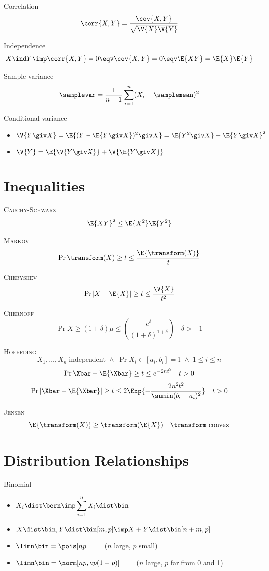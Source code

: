 \documentclass[landscape]{article}
\begin{document}
\begin{multicols*}{2}
Correlation
\[\corr{X,Y} = \displaystyle\frac{\cov{X,Y}}{\sqrt{\V{X}\V{Y}}}\]

Independence
\[X\ind Y \imp \corr{X,Y} = 0 \eqv \cov{X,Y} = 0 \eqv \E{XY}=\E{X}\E{Y}\]

Sample variance
\[\samplevar = \frac{1}{n-1}\sum_{i=1}^n(X_i-\samplemean)^2\]

Conditional variance
\begin{itemize}
  \item $\V{Y\giv X} = \E{(Y-\E{Y\giv X})^2\giv X} =\E{Y^2\giv X}-\E{Y\giv X}^2$
  \item $\V{Y} = \E{\V{Y\giv X}}+\V{\E{Y\giv X}}$
\end{itemize}

\section{Inequalities}

\textsc{Cauchy-Schwarz}
\[\E{XY}^2 \le \E{X^2}\E{Y^2}\]

\textsc{Markov}
\[\Pr{\transform(X) \ge t}\le\frac{\E{\transform(X)}}{t}\]

\textsc{Chebyshev}
\[\Pr{\lvert X-\E{X}\rvert \ge t} \le \frac{\V{X}}{t^2}\]

\textsc{Chernoff}
\[\Pr{X \ge (1+\delta)\mu}
\le \left(\frac{e^\delta}{(1+\delta)^{1+\delta}}\right) \quad \delta>-1\]

\textsc{Hoeffding}
\[X_1,\ldots,X_n \; \textrm{independent}
\;\wedge\; \Pr{X_i\in[a_i,b_i]} = 1 \;\wedge\; 1 \le i \le n \]
\[\Pr{\Xbar-\E{\Xbar} \ge t} \le e^{-2nt^2} \quad t>0 \]
\[\Pr{|\Xbar-\E{\Xbar}| \ge t} \le 2\Exp{-\frac{2n^2t^2}{\sumin(b_i-a_i)^2}}
\quad t>0\]

\textsc{Jensen}\label{jensen}
\[\E{\transform(X)} \ge \transform(\E{X}) \quad
  \transform \text{ convex}\]

\section{Distribution Relationships}

Binomial
\begin{itemize}
  \item $X_i \dist \bern \imp \displaystyle\sum_{i=1}^n X_i \dist \bin$
  \item $X\dist\bin, Y\dist\bin[m,p] \imp X+Y\dist\bin[n+m,p]$
  \item $\limn\bin = \pois[np] \qquad$ ($n$ large, $p$ small)
  \item $\limn\bin = \norm[np,np(1-p)] \qquad$
    ($n$ large, $p$ far from 0 and 1)
\end{itemize}


\end{multicols*}
\end{document}
